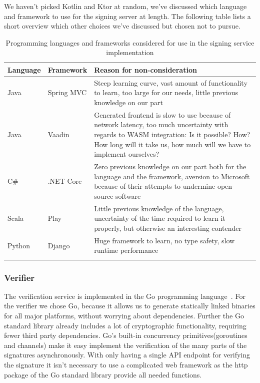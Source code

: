 We haven't picked Kotlin and Ktor at random, we've discussed which language and framework to use for the signing server at length.
The following table lists a short overview which other choices we've discussed but chosen not to pursue.

\begin{longtable}{p{1.5cm}p{2cm}p{11cm}}
    \hline
    \textbf{Language} & \textbf{Framework} & \textbf{Reason for non-consideration} \\ \hline
    Java & Spring MVC & Steep learning curve, vast amount of functionality to learn, too large for our needs, little previous knowledge on our part \\ \hline
    Java & Vaadin & Generated frontend is slow to use because of network latency, too much uncertainty with regards to \gls{WASM} integration: Is it possible? How? How long will it take us, how much will we have to implement ourselves? \\ \hline
    C\# & .NET Core & Zero previous knowledge on our part both for the language and the framework, aversion to Microsoft because of their attempts to undermine open-source software~\cite{mseee} \\ \hline
    Scala & Play & Little previous knowledge of the language, uncertainty of the time required to learn it properly, but otherwise an interesting contender \\ \hline
    Python & Django & Huge framework to learn, no type safety, slow runtime performance \\ \hline
    \caption{Programming languages and frameworks considered for use in the signing service implementation}
\end{longtable}


\subsubsection{Verifier}
The verification service is implemented in the Go programming language~\cite{golang}.
For the verifier we chose Go, because it allows us to generate statically linked binaries for all major platforms, without worrying about dependencies.
Further the Go standard library already includes a lot of cryptographic functionality, requiring fewer third party dependencies.
Go's built-in concurrency primitives(goroutines and channels) make it easy implement the verification of the many parts of the signatures asynchronously.
With only having a single \gls{API} endpoint for verifying the signature it isn't necessary to use a complicated web framework as the http package of the Go standard library provide all needed functions.

